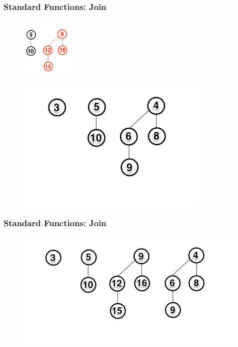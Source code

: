 \documentclass[13pt]{beamer}
\begin{document}
\begin{frame}
\frametitle{Standard Functions: Join}
  \begin{columns}[T] %
    \begin{column}[T]{8cm} %
       \begin{figure}
        \includegraphics[height=2.5cm]{./img/joinnew3.png}
      \end{figure}
    \end{column}
    \begin{column}[T]{6cm} %
       
    \end{column}
  \end{columns}

  \begin{figure}
    \includegraphics[height=6cm]{./img/joiningA.png}
  \end{figure}

\end{frame}

\begin{frame}
\frametitle{Standard Functions: Join}

  \begin{figure}
    \includegraphics[height=6cm]{./img/joiningB.png}
  \end{figure}

\end{frame}
\end{document}
